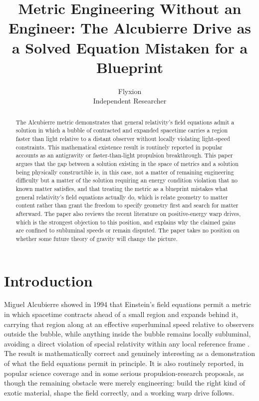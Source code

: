 \documentclass[11pt]{article}
\title{Metric Engineering Without an Engineer: The Alcubierre Drive as a Solved Equation Mistaken for a Blueprint}
\author{Flyxion \\ \small Independent Researcher}
\date{}
\begin{document}
\maketitle

\begin{abstract}
The Alcubierre metric demonstrates that general relativity's field equations admit a solution in which a bubble of contracted and expanded spacetime carries a region faster than light relative to a distant observer without locally violating light-speed constraints. This mathematical existence result is routinely reported in popular accounts as an antigravity or faster-than-light propulsion breakthrough. This paper argues that the gap between a solution existing in the space of metrics and a solution being physically constructible is, in this case, not a matter of remaining engineering difficulty but a matter of the solution requiring an energy condition violation that no known matter satisfies, and that treating the metric as a blueprint mistakes what general relativity's field equations actually do, which is relate geometry to matter content rather than grant the freedom to specify geometry first and search for matter afterward. The paper also reviews the recent literature on positive-energy warp drives, which is the strongest objection to this position, and explains why the claimed gains are confined to subluminal speeds or remain disputed. The paper takes no position on whether some future theory of gravity will change the picture.
\end{abstract}

\section{Introduction}

Miguel Alcubierre showed in 1994 that Einstein's field equations permit a metric in which spacetime contracts ahead of a small region and expands behind it, carrying that region along at an effective superluminal speed relative to observers outside the bubble, while anything inside the bubble remains locally subluminal, avoiding a direct violation of special relativity within any local reference frame \cite{A1994}. The result is mathematically correct and genuinely interesting as a demonstration of what the field equations permit in principle. It is also routinely reported, in popular science coverage and in some serious propulsion-research proposals, as though the remaining obstacle were merely engineering: build the right kind of exotic material, shape the field correctly, and a working warp drive follows.
\end{document}
